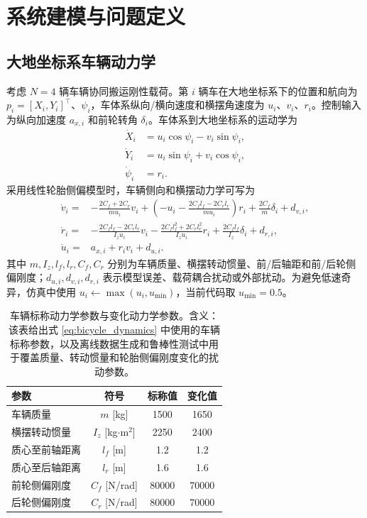 \documentclass[twocolumn,3p,times,procedia]{elsarticle}
\begin{document}
\section{系统建模与问题定义}

\subsection{大地坐标系车辆动力学}

考虑 $N=4$ 辆车辆协同搬运刚性载荷。第 $i$ 辆车在大地坐标系下的位置和航向为
$p_i=[X_i,Y_i]^\top$、$\psi_i$，车体系纵向/横向速度和横摆角速度为 $u_i$、$v_i$、$r_i$。控制输入为纵向加速度 $a_{x,i}$ 和前轮转角 $\delta_i$。车体系到大地坐标系的运动学为
\begin{equation}
\begin{aligned}
\dot X_i &= u_i\cos\psi_i-v_i\sin\psi_i,\\
\dot Y_i &= u_i\sin\psi_i+v_i\cos\psi_i,\\
\dot \psi_i &= r_i .
\end{aligned}
\label{eq:world_kinematics}
\end{equation}
采用线性轮胎侧偏模型时，车辆侧向和横摆动力学可写为
\begin{equation}
\begin{aligned}
\dot v_i=&-\frac{2C_f+2C_r}{m u_i}v_i+
\left(-u_i-\frac{2C_f l_f-2C_r l_r}{m u_i}\right)r_i
+\frac{2C_f}{m}\delta_i+d_{v,i},\\
\dot r_i=&-\frac{2C_f l_f-2C_r l_r}{I_z u_i}v_i
-\frac{2C_f l_f^2+2C_r l_r^2}{I_z u_i}r_i
+\frac{2C_f l_f}{I_z}\delta_i+d_{r,i},\\
\dot u_i=&a_{x,i}+r_i v_i+d_{u,i}.
\end{aligned}
\label{eq:bicycle_dynamics}
\end{equation}
其中 $m,I_z,l_f,l_r,C_f,C_r$ 分别为车辆质量、横摆转动惯量、前/后轴距和前/后轮侧偏刚度；$d_{u,i},d_{v,i},d_{r,i}$ 表示模型误差、载荷耦合扰动或外部扰动。为避免低速奇异，仿真中使用 $u_i\leftarrow\max(u_i,u_{\min})$，当前代码取 $u_{\min}=0.5$。

\begin{table}[!tbp]
\centering
\caption{车辆标称动力学参数与变化动力学参数。含义：该表给出式 \eqref{eq:bicycle_dynamics} 中使用的车辆标称参数，以及离线数据生成和鲁棒性测试中用于覆盖质量、转动惯量和轮胎侧偏刚度变化的扰动参数。}
\label{tab:vehicle_dynamic_params}
\footnotesize
\begin{tabular}{lccc}
\toprule
参数 & 符号 & 标称值 & 变化值 \\
\midrule
车辆质量 & $m$ [kg] & 1500 & 1650\\
横摆转动惯量 & $I_z$ [kg$\cdot$m$^2$] & 2250 & 2400\\
质心至前轴距离 & $l_f$ [m] & 1.2 & 1.2\\
质心至后轴距离 & $l_r$ [m] & 1.6 & 1.6\\
前轮侧偏刚度 & $C_f$ [N/rad] & 80000 & 70000\\
后轮侧偏刚度 & $C_r$ [N/rad] & 80000 & 70000\\
\bottomrule
\end{tabular}
\end{table}
\end{document}
